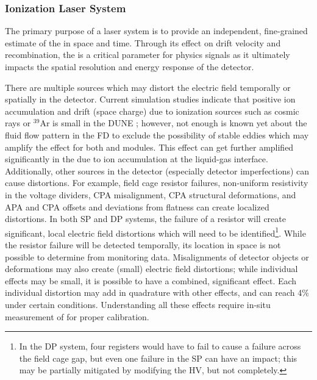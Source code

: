 \subsubsection{Ionization Laser System}
\label{sec:sp-calib-sys-las-ion}

\label{sec:sp-calib-sys-las-ion-phys} 

The primary purpose of a laser system is to provide an independent, fine-grained estimate of the \efield in space and %
time. 
Through its effect on drift velocity and recombination, the \efield is a critical parameter for physics signals as it ultimately impacts the spatial resolution and energy response of the detector.

 There are multiple sources which may distort the electric field temporally  or spatially in the detector. Current simulation studies indicate that positive ion accumulation and drift (space charge) due to ionization sources such as cosmic rays or ${}^{39}$Ar is small in the DUNE ;  however, not enough is known yet about the fluid flow pattern in the FD to exclude the possibility of stable eddies which may amplify the effect for both \single and \dual modules. This effect can get further amplified significantly in the  due to ion accumulation at the liquid-gas interface. 
Additionally, other sources in the detector (especially detector imperfections) can cause \efield distortions. For example, field cage resistor failures, non-uniform resistivity in the voltage dividers, CPA misalignment, CPA structural deformations, and APA and CPA offsets and  deviations from flatness can create localized \efield distortions. 
In both SP and DP systems, the failure of a resistor will create significant, local electric field distortions which will need to be identified\footnote{In the DP system, four registers would have to fail to cause a failure across the field cage gap, but even one failure in the SP can have an impact; this may be partially mitigated by modifying the HV, but not completely.}. While the resistor failure will be detected temporally, its location in space is not possible to determine from monitoring data. Misalignments of detector objects or deformations may also create (small) electric field distortions; while individual effects may be small, it is possible to have a combined, significant effect.
Each individual \efield distortion may add in quadrature with other effects, and can reach 4\% under certain conditions. Understanding all these effects require in-situ measurement of \efield for proper calibration. 

